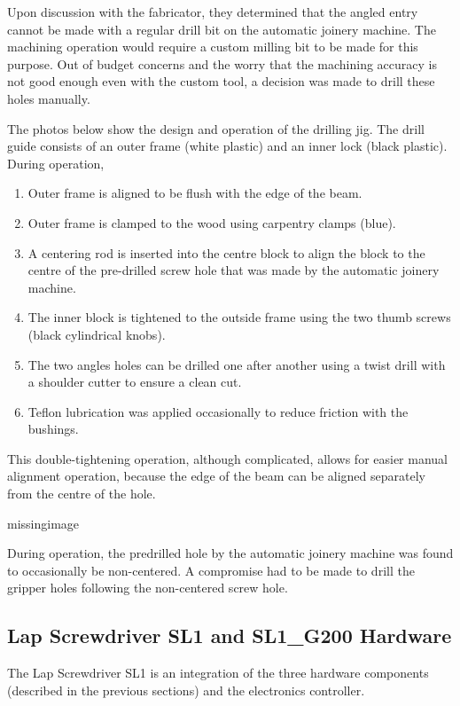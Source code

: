 Upon discussion with the fabricator, they determined that the angled entry cannot be made with a regular drill bit on the automatic joinery machine. The machining operation would require a custom milling bit to be made for this purpose. Out of budget concerns and the worry that the machining accuracy is not good enough even with the custom tool, a decision was made to drill these holes manually.

The photos below show the design and operation of the drilling jig. The drill guide consists of an outer frame (white plastic) and an inner lock (black plastic). During operation, 

\begin{enumerate}
    \item Outer frame is aligned to be flush with the edge of the beam.
    \item Outer frame is clamped to the wood using carpentry clamps (blue).
    \item A centering rod is inserted into the centre block to align the block to the centre of the pre-drilled screw hole that was made by the automatic joinery machine.
    \item The inner block is tightened to the outside frame using the two thumb screws (black cylindrical knobs).
    \item The two angles holes can be drilled one after another using a twist drill with a shoulder cutter to ensure a clean cut.
    \item Teflon lubrication was applied occasionally to reduce friction with the bushings.
\end{enumerate}

This double-tightening operation, although complicated, allows for easier manual alignment operation, because the edge of the beam can be aligned separately from the centre of the hole.

missingimage

During operation, the predrilled hole by the automatic joinery machine was found to occasionally be non-centered. A compromise had to be made to drill the gripper holes following the non-centered screw hole.

\subsection{Lap Screwdriver SL1 and SL1\_G200 Hardware}
\label{subsection:exploration-4-lap-screwdriver-sl1-and-sl1-g200-hardware}

The Lap Screwdriver SL1 is an integration of the three hardware components (described in the previous sections) and the electronics controller.

